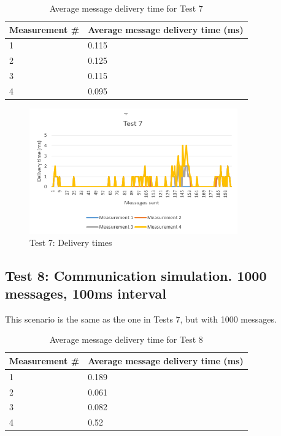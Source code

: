 \begin{table}[!ht]
\begin{center}
\begin{tabularx}{0.7\textwidth}{l|l}
\hline
\textbf{Measurement \#} & \textbf{Average message delivery time (ms)} \\
\hline
1 & 0.115\\
\hline
2 & 0.125\\
\hline
3 & 0.115\\
\hline
4 & 0.095\\
\hline
\end{tabularx}
\end{center}
\caption{Average message delivery time for Test 7}
\label{tab:test-perf7}
\end{table}

\begin{figure}[!ht]
	\centering
	\includegraphics[width=0.8\textwidth]{figures/05_testing/test-perf7}
    \caption{Test 7: Delivery times}
    \label{fig:test-perf7}
\end{figure}

\subsection{Test 8: Communication simulation. 1000 messages, 100ms interval}
This scenario is the same as the one in Tests 7, but with 1000 messages.

\begin{table}[!ht]
\begin{center}
\begin{tabularx}{0.7\textwidth}{l|l}
\hline
\textbf{Measurement \#} & \textbf{Average message delivery time (ms)} \\
\hline
1 & 0.189\\
\hline
2 & 0.061\\
\hline
3 & 0.082\\
\hline
4 & 0.52\\
\hline
\end{tabularx}
\end{center}
\caption{Average message delivery time for Test 8}
\label{tab:test-perf8}
\end{table}

